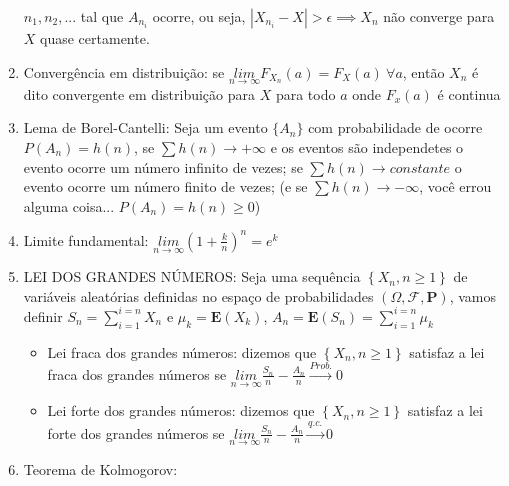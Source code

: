 \documentclass[english]{article}
\begin{document}
\begin{enumerate}
$n_{1},n_{2},...$ tal que $A_{n_{i}}$ ocorre, ou seja, $|X_{n_{i}}-X|>\epsilon\implies X_{n}$
não converge para $X$ quase certamente.
\item Convergência em distribuição: se $\underset{n\rightarrow\infty}{lim}F_{X_{n}}(a)=F_{X}(a)\ \forall a$,
então $X_{n}$ é dito convergente em distribuição para $X$ para todo
$a$ onde $F_{x}(a)$ é continua
\item Lema de Borel-Cantelli: Seja um evento $\{A_{n}\}$ com probabilidade
de ocorre $P(A_{n})=h(n)$, se $\sum h(n)\rightarrow+\infty$ e os
eventos são independetes o evento ocorre um número infinito de vezes;
se $\sum h(n)\rightarrow constante$ o evento ocorre um número finito
de vezes; (e se $\sum h(n)\rightarrow-\infty$, você errou alguma
coisa... $P(A_{n})=h(n)\ge0$)
\item Limite fundamental: $\underset{n\rightarrow\infty}{lim}(1+\frac{k}{n})^{n}=e^{k}$
\item LEI DOS GRANDES NÚMEROS: Seja uma sequência $\left\{ X_{n},n\ge1\right\} $
de variáveis aleatórias definidas no espaço de probabilidades $(\Omega,\mathcal{F},\mathbf{P})$,
vamos definir $S_{n}=\sum_{i=1}^{i=n}X_{n}$ e $\mu_{k}=\mathbf{E}(X_{k})$,
$A_{n}=\mathbf{E}(S_{n})=\sum_{i=1}^{i=n}\mu_{k}$

\begin{itemize}
\item Lei fraca dos grandes números: dizemos que $\left\{ X_{n},n\ge1\right\} $
satisfaz a lei fraca dos grandes números se $\underset{n\rightarrow\infty}{lim}\frac{S_{n}}{n}-\frac{A_{n}}{n}\overset{Prob.}{\to}0$
\item Lei forte dos grandes números: dizemos que $\left\{ X_{n},n\ge1\right\} $
satisfaz a lei forte dos grandes números se $\underset{n\rightarrow\infty}{lim}\frac{S_{n}}{n}-\frac{A_{n}}{n}\overset{q.c.}{\to}0$
\end{itemize}
\item Teorema de Kolmogorov: 


\end{enumerate}
\end{document}
